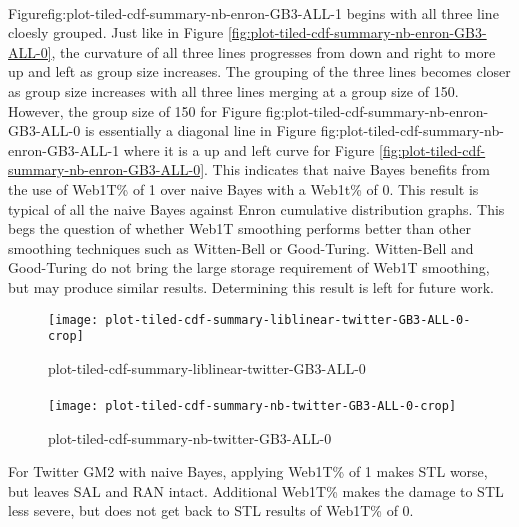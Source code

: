 \paragraph*{} Figure{fig:plot-tiled-cdf-summary-nb-enron-GB3-ALL-1} begins with all three line cloesly grouped.  Just like in Figure \ref{fig:plot-tiled-cdf-summary-nb-enron-GB3-ALL-0}, the curvature of all three lines progresses from down and right to more up and left as group size increases.  The grouping of the three lines becomes closer as group size increases with all three lines merging at a group size of 150. However, the group size of 150 for Figure {fig:plot-tiled-cdf-summary-nb-enron-GB3-ALL-0} is essentially a diagonal line in Figure {fig:plot-tiled-cdf-summary-nb-enron-GB3-ALL-1} where it is a up and left curve for Figure \ref{fig:plot-tiled-cdf-summary-nb-enron-GB3-ALL-0}.  This indicates that naive Bayes benefits from the use of Web1T\% of 1 over naive Bayes with a Web1t\% of 0.  This result is typical of all the naive Bayes against Enron cumulative distribution graphs.  This begs the question of whether Web1T smoothing performs better than other smoothing techniques such as Witten-Bell or Good-Turing.  Witten-Bell and Good-Turing do not bring the large storage requirement of Web1T smoothing, but may produce similar results.  Determining this result is left for future work.

	\begin{figure}[htbp!]
		\begin{center}
		\centering
		\texttt{[image: plot-tiled-cdf-summary-liblinear-twitter-GB3-ALL-0-crop]}
		\caption{plot-tiled-cdf-summary-liblinear-twitter-GB3-ALL-0}
		\label{fig:plot-tiled-cdf-summary-liblinear-twitter-GB3-ALL-0}
		\end{center}
	\end{figure}

\paragraph*{}

	\begin{figure}[htbp!]
		\begin{center}
		\centering
		\texttt{[image: plot-tiled-cdf-summary-nb-twitter-GB3-ALL-0-crop]}
		\caption{plot-tiled-cdf-summary-nb-twitter-GB3-ALL-0}
		\label{fig:plot-tiled-cdf-summary-nb-twitter-GB3-ALL-0}
		\end{center}
	\end{figure}
	For Twitter GM2 with naive Bayes, applying Web1T\% of 1 makes STL worse, but leaves SAL and RAN intact.  Additional Web1T\% makes the damage to STL less severe, but does not get back to STL results of Web1T\% of 0.
	
